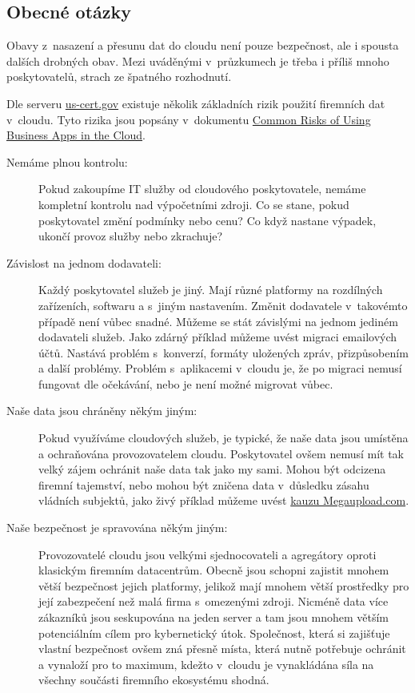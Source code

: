 \subsection{Obecné otázky}
Obavy z~nasazení a přesunu dat do cloudu není pouze bezpečnost, ale i spousta dalších drobných obav. Mezi uváděnými v~průzkumech je třeba i příliš mnoho poskytovatelů, strach ze špatného rozhodnutí.\cite{businessworld:prvniKroky}

Dle serveru \href{http://www.us-cert.gov/security-publications/Common-Risks-Using-Business-Apps-Cloud}{us-cert.gov} existuje několik základních rizik použití firemních dat v~cloudu. Tyto rizika jsou popsány v~dokumentu \href{http://www.us-cert.gov/sites/default/files/publications/using-cloud-apps-for-business.pdf}{Common Risks of Using Business Apps in the Cloud}\cite{uscert:risks}.
\begin{description}
	\item[Nemáme plnou kontrolu:] Pokud zakoupíme IT služby od cloudového poskytovatele, nemáme kompletní kontrolu nad výpočetními zdroji. Co se stane, pokud poskytovatel změní podmínky nebo cenu? Co když nastane výpadek, ukončí provoz služby nebo zkrachuje?
	\item[Závislost na jednom dodavateli:] Každý poskytovatel služeb je jiný. Mají různé platformy na rozdílných zařízeních, softwaru a s~jiným nastavením. Změnit dodavatele v~takovémto případě není vůbec snadné. Můžeme se stát závislými na jednom jediném dodavateli služeb. Jako zdárný příklad můžeme uvést migraci emailových účtů. Nastává problém s~konverzí, formáty uložených zpráv, přizpůsobením a další problémy.
	Problém s~aplikacemi v~cloudu je, že po migraci nemusí fungovat dle očekávání, nebo je není možné migrovat vůbec.
	\item[Naše data jsou chráněny někým jiným:] Pokud využíváme cloudových služeb, je typické, že naše data jsou umístěna a ochraňována provozovatelem cloudu. Poskytovatel ovšem nemusí mít tak velký zájem ochránit naše data tak jako my sami.
	Mohou být odcizena firemní tajemství, nebo mohou být zničena data v~důsledku zásahu vládních subjektů, jako živý příklad můžeme uvést \href{http://www.zive.cz/bleskovky/megaupload-zastaven-sefove-zatceni/sc-4-a-162004/default.aspx}{kauzu Megaupload.com}\cite{zive:megaupload}.
	\item[Naše bezpečnost je spravována někým jiným:] Provozovatelé cloudu jsou velkými sjednocovateli a agregátory oproti klasickým firemním datacentrům. Obecně jsou schopni zajistit mnohem větší bezpečnost jejich platformy, jelikož mají mnohem větší prostředky pro její zabezpečení než malá firma s~omezenými zdroji.
	Nicméně data více zákazníků jsou seskupována na jeden server a tam jsou mnohem větším potenciálním cílem pro kybernetický útok. Společnost, která si zajišťuje vlastní bezpečnost ovšem zná přesně místa, která nutně potřebuje ochránit a vynaloží pro to maximum, kdežto v~cloudu je vynakládána síla na všechny součásti firemního ekosystému shodná.
\end{description}

